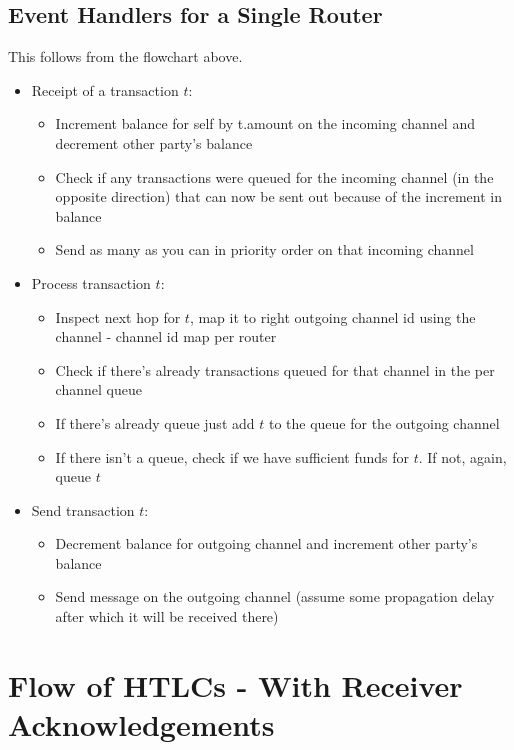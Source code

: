 \documentclass[a4paper]{article}
\begin{document}
\subsection{Event Handlers for a Single Router}
This follows from the flowchart above. 
\begin{itemize}
    \item Receipt of a transaction $t$: 
        \begin{itemize}
            \item Increment balance for self by t.amount on the incoming channel and decrement other party's balance
            \item Check if any transactions were queued for the incoming channel (in the opposite direction) that can now be sent out because of the increment in balance
            \item Send as many as you can in priority order on that incoming channel
        \end{itemize}
    \item Process transaction $t$:
        \begin{itemize}
            \item Inspect next hop for $t$, map it to right outgoing channel id using the channel - channel id map per router
            \item Check if there's already transactions queued for that channel in the per channel queue
            \item If there's already queue just add $t$ to the queue for the outgoing channel
            \item If there isn't a queue, check if we have sufficient funds for $t$. If not, again, queue $t$
        \end{itemize}
    \item Send transaction $t$:
        \begin{itemize}
            \item Decrement balance for outgoing channel and increment other party's balance
            \item Send message on the outgoing channel (assume some propagation delay after which it will be received there)
        \end{itemize}
\end{itemize}








\section{Flow of HTLCs - With Receiver Acknowledgements}
\end{document}
